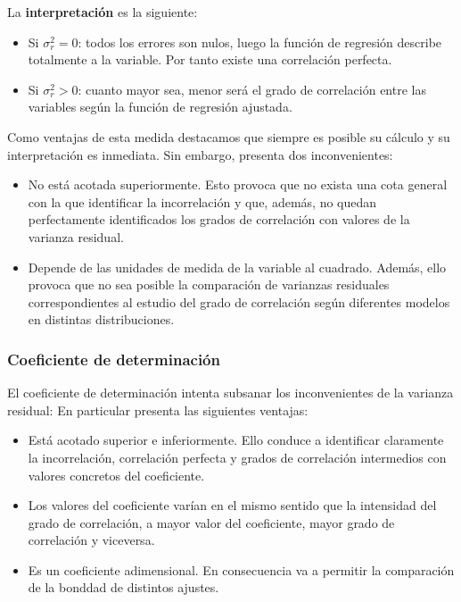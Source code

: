 \documentclass[10pt, a4paper]{article}
\theoremstyle{theorem-style}
\theoremstyle{definition-style}
\theoremstyle{remark-style}
\theoremstyle{example-style}
\theoremstyle{definition-style}
\theoremstyle{remark-style}
\begin{document}
La \textbf{interpretación} es la siguiente:

\begin{itemize}
\item Si $\sigma_r^2 = 0$: todos los errores son nulos, luego la función de
  regresión describe totalmente a la variable. Por tanto existe una correlación
  perfecta.
\item Si $\sigma_r^2 > 0$: cuanto mayor sea, menor será el grado de correlación
entre las variables según la función de regresión ajustada.
\end{itemize}
\vspace{2mm}
Como ventajas de esta medida destacamos que siempre es posible su cálculo y su
interpretación es inmediata. Sin embargo, presenta dos inconvenientes:
\begin{itemize}
	\item No está acotada superiormente. Esto provoca que no exista una cota general con la que identificar la incorrelación y que, además, no quedan perfectamente identificados los grados de correlación con valores de la varianza residual.

\item Depende de las unidades de medida de la variable al cuadrado. Además, ello provoca que no sea posible la comparación de varianzas residuales correspondientes al estudio del grado de correlación según diferentes modelos en distintas distribuciones.
\end{itemize}


\subsubsection{Coeficiente de determinación}

	El coeficiente de determinación intenta subsanar los inconvenientes de la
	varianza residual: En particular presenta las siguientes ventajas:
\begin{itemize}
	\item Está acotado superior e inferiormente. Ello conduce a identificar
	claramente la incorrelación, correlación perfecta y grados de correlación
	intermedios con valores concretos del coeficiente.
	\item Los valores del coeficiente varían en el mismo sentido que la intensidad del
	grado de correlación, a mayor valor del coeficiente, mayor grado de
	correlación y viceversa.
	\item Es un coeficiente adimensional. En consecuencia va a permitir la
	comparación de la bonddad de distintos ajustes.
\end{itemize}
\end{document}

